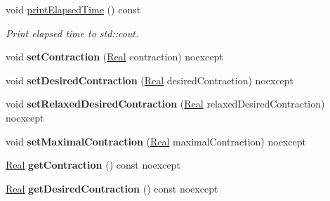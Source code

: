 \begin{DoxyCompactItemize}
\item 
\hypertarget{classSpacy_1_1Mixin_1_1Timer_a3b79b35213702118d0823f6040d5a315}{void \hyperlink{classSpacy_1_1Mixin_1_1Timer_a3b79b35213702118d0823f6040d5a315}{print\-Elapsed\-Time} () const}\label{classSpacy_1_1Mixin_1_1Timer_a3b79b35213702118d0823f6040d5a315}

\begin{DoxyCompactList}\small\item\em Print elapsed time to std\-::cout. \end{DoxyCompactList}\item 
\hypertarget{classSpacy_1_1Mixin_1_1ContractionRate_ab9215981f0454bd5d641abad582e64e5}{void {\bfseries set\-Contraction} (\hyperlink{classSpacy_1_1Real}{Real} contraction) noexcept}\label{classSpacy_1_1Mixin_1_1ContractionRate_ab9215981f0454bd5d641abad582e64e5}

\item 
\hypertarget{classSpacy_1_1Mixin_1_1ContractionRate_a26eaa6344b5b2191931a9fd87ed96f39}{void {\bfseries set\-Desired\-Contraction} (\hyperlink{classSpacy_1_1Real}{Real} desired\-Contraction) noexcept}\label{classSpacy_1_1Mixin_1_1ContractionRate_a26eaa6344b5b2191931a9fd87ed96f39}

\item 
\hypertarget{classSpacy_1_1Mixin_1_1ContractionRate_ac6e47c0ab683643fea7490703f02632d}{void {\bfseries set\-Relaxed\-Desired\-Contraction} (\hyperlink{classSpacy_1_1Real}{Real} relaxed\-Desired\-Contraction) noexcept}\label{classSpacy_1_1Mixin_1_1ContractionRate_ac6e47c0ab683643fea7490703f02632d}

\item 
\hypertarget{classSpacy_1_1Mixin_1_1ContractionRate_acc99ba536cd9a027baa50a1412d9d216}{void {\bfseries set\-Maximal\-Contraction} (\hyperlink{classSpacy_1_1Real}{Real} maximal\-Contraction) noexcept}\label{classSpacy_1_1Mixin_1_1ContractionRate_acc99ba536cd9a027baa50a1412d9d216}

\item 
\hypertarget{classSpacy_1_1Mixin_1_1ContractionRate_a49a83927f070d2dd600966f491f1f304}{\hyperlink{classSpacy_1_1Real}{Real} {\bfseries get\-Contraction} () const noexcept}\label{classSpacy_1_1Mixin_1_1ContractionRate_a49a83927f070d2dd600966f491f1f304}

\item 
\hypertarget{classSpacy_1_1Mixin_1_1ContractionRate_a3704d54e5015a9b7d9cdc2c01f41b205}{\hyperlink{classSpacy_1_1Real}{Real} {\bfseries get\-Desired\-Contraction} () const noexcept}\label{classSpacy_1_1Mixin_1_1ContractionRate_a3704d54e5015a9b7d9cdc2c01f41b205}


\end{DoxyCompactItemize}
